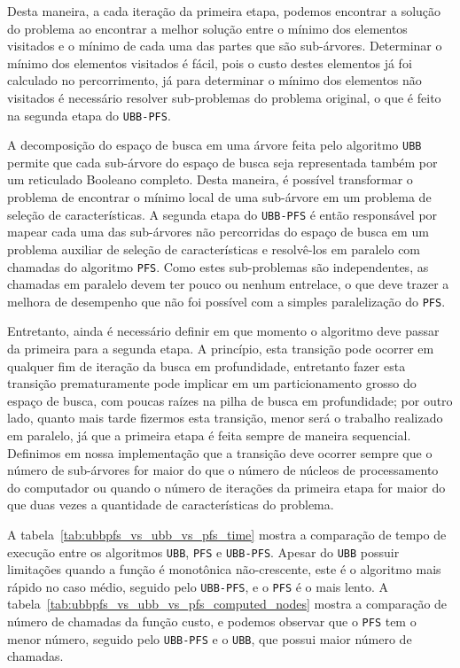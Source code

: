 \documentclass[12pt]{article}
\newcommand{\algname}[1]{\texttt{#1}}
\begin{document}
Desta maneira, a cada iteração da primeira etapa, podemos encontrar a
solução do problema ao encontrar a melhor solução entre o mínimo dos
elementos visitados e o mínimo de cada uma das partes que são 
sub-árvores. Determinar o mínimo dos elementos visitados é fácil, pois
o custo destes elementos já foi calculado no percorrimento, já
para determinar o mínimo dos elementos não visitados é necessário 
resolver sub-problemas do problema original, o que é feito na segunda
etapa do \algname{UBB-PFS}.

A decomposição do espaço de busca em uma árvore feita pelo algoritmo
\algname{UBB} permite que cada sub-árvore do espaço de busca seja
representada também por um reticulado Booleano completo. Desta maneira,
é possível transformar o problema de encontrar o mínimo local  de uma 
sub-árvore em um problema de seleção de características. A segunda etapa 
do \algname{UBB-PFS} é então responsável por mapear cada uma das 
sub-árvores não percorridas do espaço de busca em um problema auxiliar
de seleção de características e resolvê-los em paralelo com chamadas
do algoritmo \algname{PFS}. Como estes sub-problemas são independentes,
as chamadas em paralelo devem ter pouco ou nenhum entrelace, o que deve
trazer a melhora de desempenho que não foi possível com a simples 
paralelização do \algname{PFS}.

Entretanto, ainda é necessário definir em que momento o algoritmo deve
passar da primeira para a segunda etapa. A princípio, esta transição
pode ocorrer em qualquer fim de iteração da busca em profundidade, 
entretanto fazer esta transição prematuramente pode implicar em um 
particionamento grosso do espaço de busca, com poucas raízes na pilha
de busca em profundidade; por outro lado, quanto mais tarde fizermos 
esta transição, menor será o trabalho realizado em paralelo, já que a
primeira etapa  é feita sempre de maneira sequencial. Definimos em nossa 
implementação que a transição deve ocorrer sempre que o número de 
sub-árvores for maior do que o número de núcleos de processamento do 
computador ou quando o número de iterações da primeira etapa for maior
do que duas vezes a quantidade de características do problema.

A tabela~\ref{tab:ubbpfs_vs_ubb_vs_pfs_time} mostra a comparação de 
tempo de execução entre os algoritmos \algname{UBB}, \algname{PFS} e
\algname{UBB-PFS}. Apesar do \algname{UBB} possuir limitações quando
a função é monotônica não-crescente, este é o algoritmo mais rápido
no caso médio, seguido pelo \algname{UBB-PFS}, e o \algname{PFS} é o 
mais lento. A tabela~\ref{tab:ubbpfs_vs_ubb_vs_pfs_computed_nodes} 
mostra a comparação de número de chamadas da função custo, e podemos
observar que o \algname{PFS} tem o menor número, seguido pelo 
\algname{UBB-PFS} e o \algname{UBB}, que possui maior número de 
chamadas.
\end{document}
